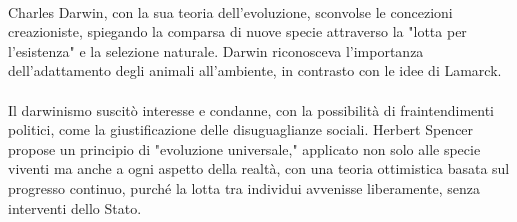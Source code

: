 \documentclass{report}
\begin{document}
\\
Charles Darwin, con la sua teoria dell'evoluzione, sconvolse le concezioni creazioniste, spiegando la comparsa di nuove specie attraverso la "lotta per l'esistenza" e la selezione naturale. Darwin riconosceva l'importanza dell'adattamento degli animali all'ambiente, in contrasto con le idee di Lamarck.
\\
\\
Il darwinismo suscitò interesse e condanne, con la possibilità di fraintendimenti politici, come la giustificazione delle disuguaglianze sociali. Herbert Spencer propose un principio di "evoluzione universale," applicato non solo alle specie viventi ma anche a ogni aspetto della realtà, con una teoria ottimistica basata sul progresso continuo, purché la lotta tra individui avvenisse liberamente, senza interventi dello Stato.
\\
\\
\end{document}
